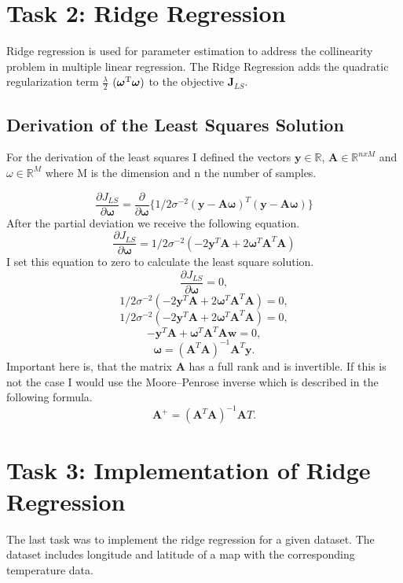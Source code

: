 \documentclass[10pt, a4paper, twocolumn]{article} %
\begin{document}
\section{Task 2: Ridge Regression}
Ridge regression is used for parameter estimation to address the collinearity problem in multiple linear regression. 
\citep{ridgeRegression} The Ridge Regression adds the quadratic regularization term 
$\frac{\lambda}{2}$
$(\boldsymbol{\omega}\textsuperscript{T}\boldsymbol{\omega})$ to the objective $\textbf{J}_{LS}$.
\citep{bookMachineLearning}

\subsection{Derivation of the Least Squares Solution}
For the derivation of the least squares I defined the vectors $\textbf{y} \in \mathbb{R}$,
$\textbf{A} \in \mathbb{R}^{nxM}$ and
$\textbf{$\omega$} \in \mathbb{R}^{M}$ where M is the dimension and n the number of samples.

\[
\frac{\partial \textbf{$J_{LS}$}}{\partial \boldsymbol{\omega}} = 
\frac{\partial}{\partial \boldsymbol{\omega}}
\{1/2\sigma^{-2}
(\textbf{y} - \textbf{A}\boldsymbol{\omega})^{T}
(\textbf{y} - \textbf{A}\boldsymbol{\omega})
\}
\]
After the partial deviation we receive the following equation. 
\[
\frac{\partial \textbf{$J_{LS}$}}{\partial \boldsymbol{\omega}} = 
1/2\sigma^{-2}
(-2 \textbf{y}^{T} \textbf{A} + 2 \boldsymbol{\omega}^{T}\textbf{A}^{T}\textbf{A})
\]
I set this equation to zero to calculate the least square solution. 
\[
\frac{\partial \textbf{$J_{LS}$}}{\partial \boldsymbol{\omega}} = 0,
\]
\[
1/2\sigma^{-2}
(-2 \textbf{y}^{T} \textbf{A} + 2 \boldsymbol{\omega}^{T}\textbf{A}^{T}\textbf{A}) = 0,
\]
\[
1/2\sigma^{-2}
(-2 \textbf{y}^{T} \textbf{A} + 2 \boldsymbol{\omega}^{T}\textbf{A}^{T}\textbf{A}) = 0,
\]
\[
-\textbf{y}^{T} \textbf{A} + \boldsymbol{\omega}^{T} \textbf{A}^{T}\textbf{A}\boldsymbol{w} = 0,
\]
\[
 \boldsymbol{\omega} = (\textbf{A}^{T}\textbf{A})^{-1}\textbf{A}^{T}\textbf{y}.
\]
\citep{bookMachineLearning}
Important here is, that the matrix \textbf{A} has a full rank and is invertible. If this is not the case I would use 
the Moore–Penrose inverse which is described in the following formula. 
\[
\textbf{A}^{+} = (\textbf{A}^{T}\textbf{A})^{-1}\textbf{A}{T}.
\]
\citep{bookMachineLearning}


\section{Task 3: Implementation of Ridge Regression}
The last task was to implement the ridge regression for a given dataset. The dataset includes longitude and latitude of a map with the corresponding temperature data. 
\end{document}
